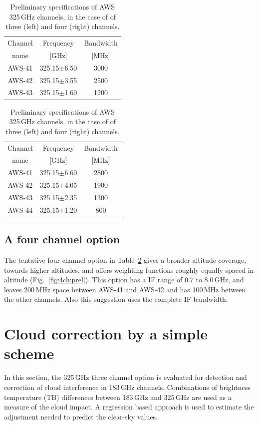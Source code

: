 \documentclass[12pt]{article}
\begin{document}
\begin{table}[!t]
  \begin{minipage}[b]{0.5\linewidth}
  \centering  
  \begin{tabular}[c]{c|c|c}
    Channel & Frequency   & Bandwidth \\
    name    & [GHz] &  [MHz] \\
    \hline
    AWS-41  & 325.15$\pm$6.50 & 3000\\
    AWS-42  & 325.15$\pm$3.55 & 2500\\
    AWS-43  & 325.15$\pm$1.60 & 1200\\
    \hline
  \end{tabular}
  \end{minipage}%
  \begin{minipage}[b]{0.5\linewidth}
  \centering  
  \begin{tabular}[c]{c|c|c}
    Channel & Frequency   & Bandwidth \\
    name    & [GHz] &  [MHz] \\
    \hline
    AWS-41  & 325.15$\pm$6.60 & 2800\\
    AWS-42  & 325.15$\pm$4.05 & 1900\\
    AWS-43  & 325.15$\pm$2.35 & 1300\\
    AWS-44  & 325.15$\pm$1.20 & \phantom{0}800\\
    \hline
  \end{tabular}
  \end{minipage}  
  \caption{Preliminary specifications of AWS 325\,GHz channels, in the case of
    of three (left) and four (right) channels.}
  \label{tab:chs:prel}
\end{table}




\subsection{A four channel option}
%
The tentative four channel option in Table~\ref{tab:chs:prel} gives a broader
altitude coverage, towards higher altitudes, and offers weighting functions
roughly equally spaced in altitude (Fig.~\ref {fig:4ch:prel}). This option has
a IF range of 0.7 to 8.0\,GHz, and leaves 200\,MHz space between AWS-41 and
AWS-42 and has 100\,MHz between the other channels. Also this suggestion uses
the complete IF bandwidth.


\section{Cloud correction by a simple scheme}
%
In this section, the 325\,GHz three channel option is evaluated for detection
and correction of cloud interference in 183\,GHz channels. Combinations of
brightness temperature (TB) differences between 183\,GHz and 325\,GHz are used
as a measure of the cloud impact. A regression based approach is used to
estimate the adjustment needed to predict the clear-sky values.
\end{document}
